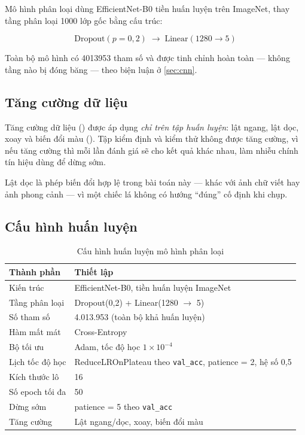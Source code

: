 Mô hình phân loại dùng EfficientNet-B0 tiền huấn luyện trên ImageNet, thay tầng
phân loại 1000 lớp gốc bằng cấu trúc:

\begin{equation}
    \text{Dropout}(p = 0{,}2) \;\rightarrow\; \text{Linear}(1280 \rightarrow 5)
    \label{eq:cls_head}
\end{equation}

Toàn bộ mô hình có \num{4013953} tham số và được tinh chỉnh hoàn toàn --- không
tầng nào bị đóng băng --- theo biện luận ở \cref{sec:cnn}.

\subsection{Tăng cường dữ liệu}

Tăng cường dữ liệu () được áp dụng \emph{chỉ trên tập huấn
luyện}: lật ngang, lật dọc, xoay và biến đổi màu (). Tập kiểm
định và kiểm thử không được tăng cường, vì nếu tăng cường thì mỗi lần đánh giá sẽ
cho kết quả khác nhau, làm nhiễu chính tín hiệu dùng để dừng sớm.

Lật dọc là phép biến đổi hợp lệ trong bài toán này --- khác với ảnh chữ viết hay
ảnh phong cảnh --- vì một chiếc lá không có hướng ``đúng'' cố định khi chụp.

\subsection{Cấu hình huấn luyện}

\begin{table}[H]
\centering
\caption{Cấu hình huấn luyện mô hình phân loại}
\label{tab:cauhinh_cls}
\begin{tabular}{L{4.6cm} L{8.4cm}}
\toprule
\textbf{Thành phần} & \textbf{Thiết lập} \\
\midrule
Kiến trúc          & EfficientNet-B0, tiền huấn luyện ImageNet \\
Tầng phân loại     & Dropout(0,2) + Linear(1280 $\rightarrow$ 5) \\
Số tham số         & 4.013.953 (toàn bộ khả huấn luyện) \\
Hàm mất mát        & Cross-Entropy \\
Bộ tối ưu          & Adam, tốc độ học $1 \times 10^{-4}$ \\
Lịch tốc độ học    & ReduceLROnPlateau theo \texttt{val\_acc}, patience = 2, hệ số 0,5 \\
Kích thước lô      & 16 \\
Số epoch tối đa    & 50 \\
Dừng sớm           & patience = 5 theo \texttt{val\_acc} \\
Tăng cường         & Lật ngang/dọc, xoay, biến đổi màu \\
\bottomrule
\end{tabular}
\end{table}

